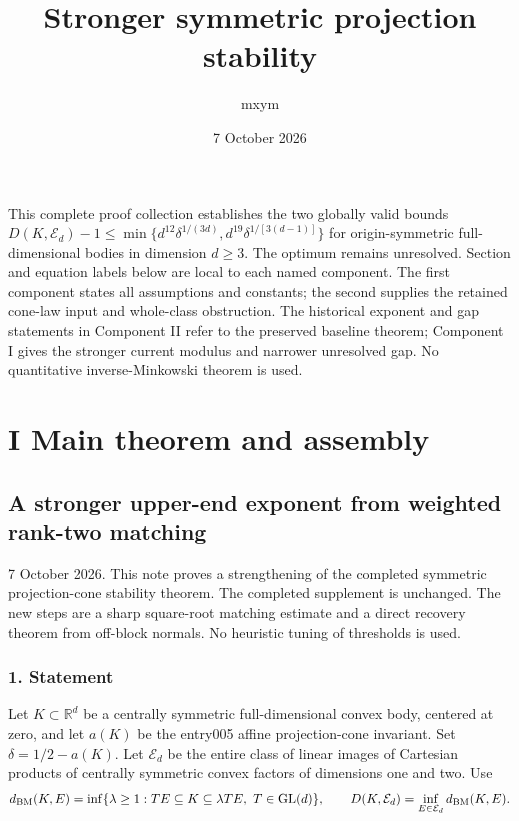 \documentclass[
  11pt,
]{article}
\title{Stronger symmetric projection stability}
\author{mxym}
\date{7 October 2026}
\begin{document}
\maketitle

This complete proof collection establishes the two globally valid bounds
\(D(K,\mathcal E_d)-1\le\min\{d^{12}\delta^{1/(3d)},d^{19}\delta^{1/[3(d-1)]}\}\)
for origin-symmetric full-dimensional bodies in dimension \(d\ge3\). The
optimum remains unresolved. Section and equation labels below are local
to each named component. The first component states all assumptions and
constants; the second supplies the retained cone-law input and
whole-class obstruction. The historical exponent and gap statements in
Component II refer to the preserved baseline theorem; Component I gives
the stronger current modulus and narrower unresolved gap. No
quantitative inverse-Minkowski theorem is used.

\newpage

\section{I Main theorem and assembly}\label{i-main-theorem-and-assembly}

\subsection{A stronger upper-end exponent from weighted rank-two
matching}\label{a-stronger-upper-end-exponent-from-weighted-rank-two-matching}

7 October 2026. This note proves a strengthening of the completed
symmetric projection-cone stability theorem. The completed supplement is
unchanged. The new steps are a sharp square-root matching estimate and a
direct recovery theorem from off-block normals. No heuristic tuning of
thresholds is used.

\subsubsection{1. Statement}\label{statement}

Let \(K\subset\mathbb R^d\) be a centrally symmetric full-dimensional
convex body, centered at zero, and let \(a(K)\) be the entry005 affine
projection-cone invariant. Set \(\delta=1/2-a(K)\). Let \(\mathcal E_d\)
be the entire class of linear images of Cartesian products of centrally
symmetric convex factors of dimensions one and two. Use \[
d_{\rm BM}(K,E)=\inf\{\lambda\ge1:TE\subseteq K\subseteq\lambda TE,
\ T\in\mathrm{GL}(d)\},\qquad
D(K,\mathcal E_d)=\inf_{E\in\mathcal E_d}d_{\rm BM}(K,E).
\]
\end{document}
